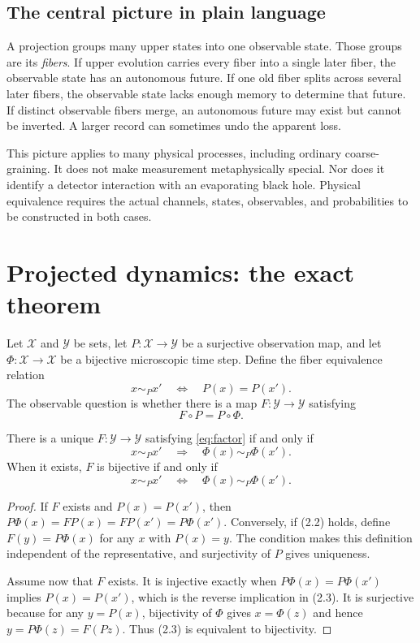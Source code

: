 \documentclass[11pt]{article}
\newcommand{\X}{\mathcal X}
\newcommand{\Y}{\mathcal Y}
\begin{document}
\subsection{The central picture in plain language}

A projection groups many upper states into one observable state. Those groups
are its \emph{fibers}. If upper evolution carries every fiber into a single
later fiber, the observable state has an autonomous future. If one old fiber
splits across several later fibers, the observable state lacks enough memory
to determine that future. If distinct observable fibers merge, an autonomous
future may exist but cannot be inverted. A larger record can sometimes undo
the apparent loss.

This picture applies to many physical processes, including ordinary
coarse-graining. It does not make measurement metaphysically special. Nor
does it identify a detector interaction with an evaporating black hole.
Physical equivalence requires the actual channels, states, observables, and
probabilities to be constructed in both cases.

\section{Projected dynamics: the exact theorem}

Let $\X$ and $\Y$ be sets, let $P:\X\to\Y$ be a surjective observation map,
and let $\Phi:\X\to\X$ be a bijective microscopic time step. Define the fiber
equivalence relation
\[
 x\sim_P x'
 \quad\Longleftrightarrow\quad
 P(x)=P(x').
\]
The observable question is whether there is a map $F:\Y\to\Y$ satisfying
\begin{equation}
 F\circ P=P\circ\Phi.
 \label{eq:factor}
\end{equation}

\begin{theorem}
\label{thm:factor}
There is a unique $F:\Y\to\Y$ satisfying \eqref{eq:factor} if and only if
\[
 x\sim_P x'
 \quad\Longrightarrow\quad
 \Phi(x)\sim_P\Phi(x').
 \tag{2.2}
\]
When it exists, $F$ is bijective if and only if
\[
 x\sim_P x'
 \quad\Longleftrightarrow\quad
 \Phi(x)\sim_P\Phi(x').
 \tag{2.3}
\]
\end{theorem}

\begin{proof}
If $F$ exists and $P(x)=P(x')$, then
$P\Phi(x)=FP(x)=FP(x')=P\Phi(x')$. Conversely, if (2.2) holds, define
$F(y)=P\Phi(x)$ for any $x$ with $P(x)=y$. The condition makes this
definition independent of the representative, and surjectivity of $P$ gives
uniqueness.

Assume now that $F$ exists. It is injective exactly when
$P\Phi(x)=P\Phi(x')$ implies $P(x)=P(x')$, which is the reverse implication
in (2.3). It is surjective because for any $y=P(x)$, bijectivity of $\Phi$
gives $x=\Phi(z)$ and hence $y=P\Phi(z)=F(Pz)$. Thus (2.3) is equivalent to
bijectivity.
\end{proof}
\end{document}
